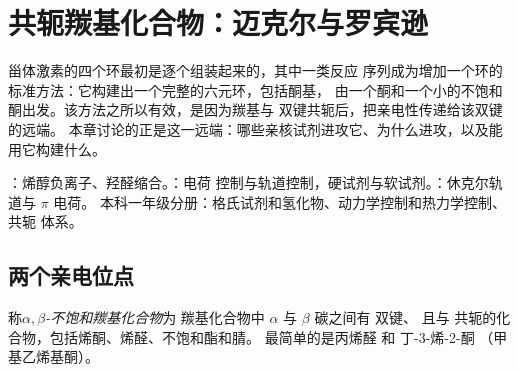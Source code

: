 \chapter{共轭羰基化合物：迈克尔与罗宾逊}\label{ch:b2:conjugate-additions}

甾体激素的四个环最初是逐个组装起来的，其中一类反应
序列成为增加一个环的标准方法：它构建出一个完整的六元环，包括酮基，
由一个酮和一个小的不饱和酮出发。该方法之所以有效，是因为羰基与
 双键共轭后，把亲电性传递给该双键的远端。
本章讨论的正是这一远端：哪些亲核试剂进攻它、为什么进攻，以及能用它构建什么。

\begin{recall}
：烯醇负离子、羟醛缩合。：电荷
控制与轨道控制，硬试剂与软试剂。：休克尔轨道与 $\pi$ 电荷。
本科一年级分册：格氏试剂和氢化物、动力学控制和热力学控制、共轭
体系。
\end{recall}

\section{两个亲电位点}

\begin{definition}\label{def:b2:conjugate-additions:enone}
称\emph{$\alpha,\beta$-不饱和羰基化合物}为
羰基化合物中 $\alpha$ 与 $\beta$ 碳之间有  双键、
且与  共轭的化合物，包括烯酮、烯醛、不饱和酯和腈。
最简单的是丙烯醛  和
丁-3-烯-2-酮 （甲基乙烯基酮）。
\end{definition}

